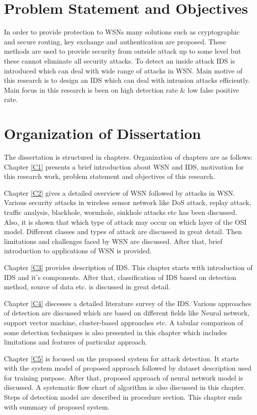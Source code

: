 \section{Problem Statement and Objectives}
In order to provide protection to WSNs many solutions such as cryptographic and secure routing, key exchange and authentication are proposed. These methods are used to provide security from outside attack up to some level but these cannot eliminate all security attacks. To detect an inside attack IDS is introduced which can deal with wide range of attacks in WSN. Main motive of this research is to design an IDS which can deal with intrusion attacks efficiently. Main focus in this research is been on high detection rate \& low false positive rate.
\section{Organization of Dissertation}
The dissertation is structured in chapters. Organization of chapters are as follows:
\\
\noindent Chapter \ref{C1} presents a brief introduction about WSN and IDS, motivation for this research work, problem statement and objectives of this research.
\par Chapter \ref{C2} gives a detailed overview of WSN followed by attacks in WSN. Various security attacks in wireless sensor network like DoS attack, replay attack, traffic analysis, blackhole, wormhole, sinkhole attacks etc has been discussed. Also, it is shown that which type of attack may occur on which layer of the OSI model. Different classes and types of attack are discussed in great detail. Then limitations and challenges faced by WSN are discussed. After that, brief introduction to applications of WSN is provided. 
\par Chapter \ref{C3} provides description of IDS. This chapter starts with introduction of IDS and it's components. After that, classification  of IDS based on detection method, source of data etc. is discussed in great detail.
\par Chapter \ref{C4} discesses a detailed literature survey of the IDS.
Various approaches of detection are discussed which are based on different fields like Neural network, support vector machine, cluster-based approaches etc. A tabular comparison of some detection techniques is also presented in this chapter which includes limitations and features of particular approach.
\par Chapter \ref{C5} is focused on the proposed system for attack detection. It starts with the system model of proposed approach followed by dataset description used for training purpose. After that, proposed approach of neural network model is discussed. A systematic flow chart of algorithm is also discussed in this chapter. Steps of detection model are described in procedure section. This chapter ends with summary of proposed system.
